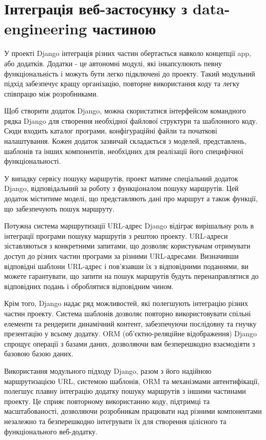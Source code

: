 \section{Інтеграція веб-застосунку з data-engineering частиною}
\label{sec:integration-design}

У проекті Django інтеграція різних частин обертається навколо концепції app, або додатків. Додатки - це автономні модулі, які інкапсулюють певну функціональність і можуть бути легко підключені до проекту. Такий модульний підхід забезпечує кращу організацію, повторне використання коду та легку співпрацю між розробниками.

Щоб створити додаток Django, можна скористатися інтерфейсом командного рядка Django для створення необхідної файлової структури та шаблонного коду. Сюди входить каталог програми, конфігураційні файли та початкові налаштування. Кожен додаток зазвичай складається з моделей, представлень, шаблонів та інших компонентів, необхідних для реалізації його специфічної функціональності.

У випадку сервісу пошуку маршрутів, проект матиме спеціальний додаток Django, відповідальний за роботу з функціоналом пошуку маршрутів. Цей додаток міститиме моделі, що представляють дані про маршрут а також функції, що забезпечують пошук маршруту.

Потужна система маршрутизації URL-адрес Django відіграє вирішальну роль в інтеграції програми пошуку маршрутів з рештою проекту. URL-адреси зіставляються з конкретними запитами, що дозволяє користувачам отримувати доступ до різних частин програми за різними URL-адресами. Визначивши відповідні шаблони URL-адрес і пов'язавши їх з відповідними поданнями, ви можете гарантувати, що запити на пошук маршрутів будуть перенаправлятися до відповідних подань і оброблятися відповідним чином.

Крім того, Django надає ряд можливостей, які полегшують інтеграцію різних частин проекту. Система шаблонів дозволяє повторно використовувати спільні елементи та рендерити динамічний контент, забезпечуючи послідовну та гнучку презентацію у всьому додатку. ORM (об'єктно-реляційне відображення) Django спрощує операції з базами даних, дозволяючи вам безперешкодно взаємодіяти з базовою базою даних.

Використання модульного підходу Django, разом з його надійною маршрутизацією URL, системою шаблонів, ORM та механізмами автентифікації, полегшує плавну інтеграцію додатку пошуку маршрутів з іншими частинами проекту. Це сприяє повторному використанню коду, підтримці та масштабованості, дозволяючи розробникам працювати над різними компонентами незалежно та безперешкодно інтегрувати їх для створення цілісного та функціонального веб-додатку.